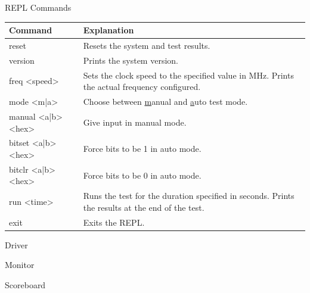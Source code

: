 \documentclass[t]{beamer}
\begin{document}
\begin{frame}{REPL Commands}
  \begin{table}[H]
    \centering
    \begin{tabular}{|>{\ttfamily\scriptsize}p{8em}|>{\scriptsize}p{\dimexpr\textwidth-12em}|}
      \hline
      \textrm{Command}   & Explanation \\
      \hline
      reset              & Resets the system and test results. \\
      version            & Prints the system version. \\
      freq <speed>       & Sets the clock speed to the specified value in MHz. Prints the actual frequency configured. \\
      mode <m|a>         & Choose between \underline{m}anual and \underline{a}uto test mode. \\
      manual <a|b> <hex> & Give input in manual mode. \\
      bitset <a|b> <hex> & Force bits to be 1 in auto mode. \\
      bitclr <a|b> <hex> & Force bits to be 0 in auto mode. \\
      run <time>         & Runs the test for the duration specified in seconds. Prints the results at the end of the test. \\
      exit               & Exits the REPL. \\
      \hline
    \end{tabular}
  \end{table}
\end{frame}

\begin{frame}{Driver}
  \centering
  \resizebox{\textwidth}{!}{%
    
  }
\end{frame}

\begin{frame}{Monitor}
  \centering
  \resizebox{\textwidth}{!}{%
    
  }
\end{frame}

\begin{frame}{Scoreboard}
  \centering
  \resizebox{\textwidth}{!}{%
    
  }
\end{frame}
\end{document}
